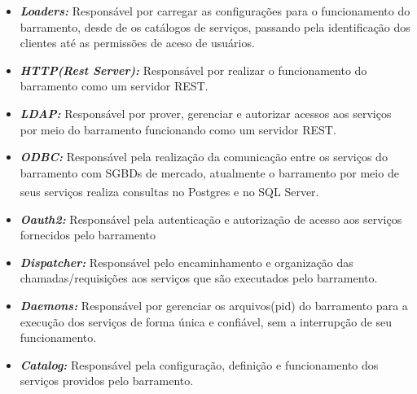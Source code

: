 \begin{itemize}
    \item \textit{\textbf{Loaders:}}
    Responsável por carregar as configurações para o funcionamento do barramento, desde de os catálogos de serviços, passando pela identificação dos clientes até as permissões de aceso de usuários.  
    \item \textit{\textbf{HTTP(Rest Server):}}
    Responsável por realizar o funcionamento do barramento como um servidor \acrshort{REST}.
    \item \textit{\textbf{LDAP:}}
    Responsável por prover, gerenciar e autorizar acessos aos serviços por meio do barramento funcionando como um servidor REST.
    \item \textit{\textbf{ODBC:}}
    Responsável pela realização da comunicação entre os serviços do barramento com SGBDs de mercado, atualmente o barramento por meio de seus serviços realiza consultas no Postgres\textsuperscript{\textregistered} e no SQL Server\textsuperscript{\textregistered}.
    \item \textit{\textbf{Oauth2:}}
    Responsável pela autenticação e autorização de acesso aos serviços fornecidos pelo barramento
    \item \textit{\textbf{Dispatcher:}}
    Responsável pelo encaminhamento e organização das chamadas/requisições aos serviços que são executados pelo barramento.
    \item \textit{\textbf{Daemons:}}
    Responsável por gerenciar os arquivos(pid) do barramento para a execução dos serviços de forma única e confiável, sem a interrupção de seu funcionamento. 
    \item \textit{\textbf{Catalog:}}
    Responsável pela configuração, definição e funcionamento dos serviços providos pelo barramento.
\end{itemize}

